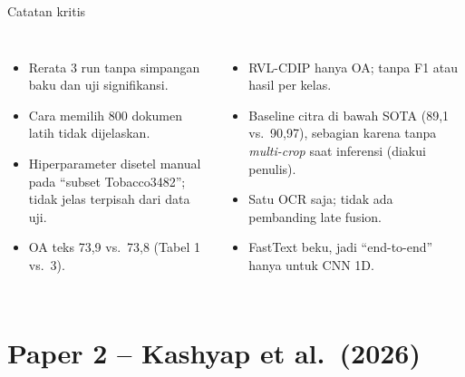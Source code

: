 \documentclass[aspectratio=169,10pt]{beamer}
\newcommand\kecil{\fontsize{8}{9.5}\selectfont}
\begin{document}
\begin{frame}{Catatan kritis}
  \begin{columns}[T]
    \begin{itemize}\kecil
      \item Rerata 3 run tanpa simpangan baku dan uji signifikansi.
      \item Cara memilih 800 dokumen latih tidak dijelaskan.
      \item Hiperparameter disetel manual pada ``subset Tobacco3482''; tidak jelas terpisah dari data uji.
      \item OA teks 73,9 vs.\ 73,8 (Tabel 1 vs.\ 3).
    \end{itemize}
    \begin{itemize}\kecil
      \item RVL-CDIP hanya OA; tanpa F1 atau hasil per kelas.
      \item Baseline citra di bawah SOTA (89,1 vs.\ 90,97), sebagian karena tanpa \emph{multi-crop} saat inferensi (diakui penulis).
      \item \alert{Satu OCR saja}; tidak ada pembanding late fusion.
      \item FastText beku, jadi ``end-to-end'' hanya untuk CNN 1D.
    \end{itemize}
  \end{columns}
\end{frame}

\section{Paper 2 -- Kashyap et al.\ (2026)}
\end{document}
